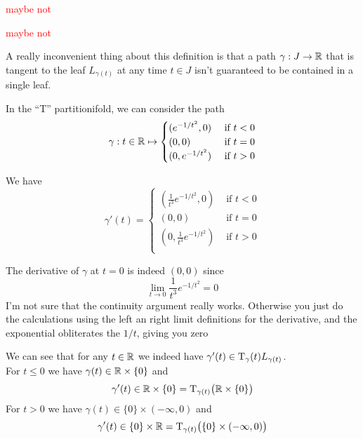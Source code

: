 	\begin{example}
		\textcolor{Red}{maybe not}
	\end{example}

	\begin{example}
		\textcolor{Red}{maybe not}
	\end{example}


	A really inconvenient thing about this definition is that a path $\gamma : J \to \mathbb{R}$ that is tangent to the leaf $L_{\gamma(t)}$ at any time $t \in J$ isn't guaranteed to be contained in a single leaf.

	\begin{example}
		In the ``T'' partitionifold, we can consider the path
		$$
			\gamma: t \in \mathbb{R} \mapsto
			\begin{cases}
				(e^{-1/t^2}, 0)  &\text{ if } t < 0 \\
				(0, 0)           &\text{ if } t = 0 \\
				(0, e^{-1/t^2})  &\text{ if } t > 0 \\
			\end{cases}
		$$

		We have
		$$
			\gamma'(t) =
			\begin{cases}
				(\frac{1}{t^3} e^{-1/t^2}, 0)  &\text{ if } t < 0 \\
				(0, 0)                         &\text{ if } t = 0 \\
				(0, \frac{1}{t^3} e^{-1/t^2})  &\text{ if } t > 0 \\
			\end{cases}
		$$
		
		The derivative of $\gamma$ at $t=0$ is indeed $(0,0)$ since
		$$
			\lim_{t \to 0} \frac{1}{t^3} e^{-1/t^2} = 0
		$$
		{\color{Red}I'm not sure that the continuity argument really works. Otherwise you just do the calculations using the left an right limit definitions for the derivative, and the exponential obliterates the $1/t$, giving you zero}

		We can see that for any $t \in \mathbb{R}$ we indeed have $\gamma'(t) \in \mathrm{T}_\gamma(t) L_{\gamma(t)}$. \\
		For $t \leq 0$ we have $\gamma(t) \in \mathbb{R} \times \{0\}$ and
		$$
			\gamma'(t) \in \mathbb{R} \times \{0\} = \mathrm{T}_{\gamma(t)}\big( \mathbb{R} \times \{0\} \big)
		$$
		For $t > 0$ we have $\gamma(t) \in \{0\} \times (-\infty, 0)$ and
		$$
			\gamma'(t) \in \{0\} \times \mathbb{R} = \mathrm{T}_{\gamma(t)}\big( \{0\} \times (-\infty, 0) \big)
		$$
	\end{example}

